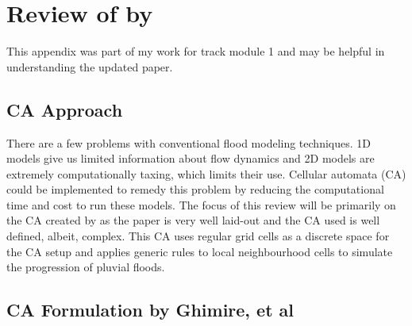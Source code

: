 

\chapter{Review of  by \citeauthor{Ghimire}} %
\label{AppendixA} %


This appendix was part of my work for track module 1 and may be helpful in understanding the updated paper.
\section*{CA Approach}
There are a few problems with conventional flood modeling techniques. 1D models give us limited information about flow dynamics and 2D models are extremely computationally taxing, which limits their use. Cellular automata (CA) could be implemented to remedy this problem by reducing the computational time and cost to run these models. The focus of this review will be primarily on the CA created by \cite{Ghimire} as the paper is very well laid-out and the CA used is well defined, albeit, complex. This CA uses regular grid cells as a discrete space for the CA setup and applies generic rules to local neighbourhood cells to simulate the progression of pluvial floods.

\section*{CA Formulation by Ghimire, et al}

